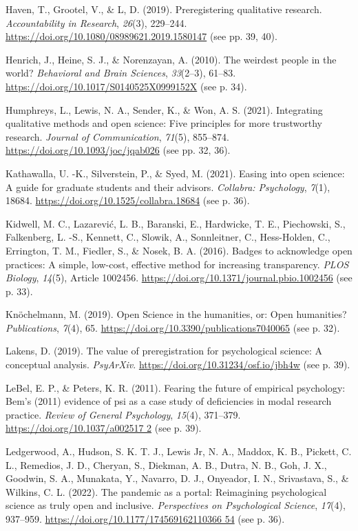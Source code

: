 \documentclass[authordate, empirical,issue]{jote-new-article}
\begin{document}
Haven, T., Grootel, V., \& L, D. (2019). Preregistering qualitative research. \emph{Accountability in Research}, \emph{26}(3), 229–244. \url{https://doi.org/10.1080/08989621.2019.1580147} (see pp. 39, 40).

Henrich, J., Heine, S. J., \& Norenzayan, A. (2010). The weirdest people in the world? \emph{Behavioral and Brain Sciences}, \emph{33}(2–3), 61–83. \url{https://doi.org/10.1017/S0140525X0999152X} (see p. 34).

Humphreys, L., Lewis, N. A., Sender, K., \& Won, A. S. (2021). Integrating qualitative methods and open science: Five principles for more trustworthy research. \emph{Journal of Communication}, \emph{71}(5), 855–874. \url{https://doi.org/10.1093/joc/jqab026} (see pp. 32, 36).

Kathawalla, U. -K., Silverstein, P., \& Syed, M. (2021). Easing into open science: A guide for graduate students and their advisors. \emph{Collabra: Psychology}, \emph{7}(1), 18684. \url{https://doi.org/10.1525/collabra.18684} (see p. 36).

Kidwell, M. C., Lazarević, L. B., Baranski, E., Hardwicke, T. E., Piechowski, S., Falkenberg, L. -S., Kennett, C., Slowik, A., Sonnleitner, C., Hess-Holden, C., Errington, T. M., Fiedler, S., \& Nosek, B. A. (2016). Badges to acknowledge open practices: A simple, low-cost, effective method for increasing transparency. \emph{PLOS Biology}, \emph{14}(5), Article 1002456. \url{https://doi.org/10.1371/journal.pbio.1002456} (see p. 33).

Knöchelmann, M. (2019). Open Science in the humanities, or: Open humanities? \emph{Publications}, \emph{7}(4), 65. \url{https://doi.org/10.3390/publications7040065} (see p. 32).

Lakens, D. (2019). The value of preregistration for psychological science: A conceptual analysis. \emph{PsyArXiv}. \url{https://doi.org/10.31234/osf.io/jbh4w} (see p. 39).

LeBel, E. P., \& Peters, K. R. (2011). Fearing the future of empirical psychology: Bem’s (2011) evidence of psi as a case study of deficiencies in modal research practice. \emph{Review of General Psychology}, \emph{15}(4), 371–379. \url{https://doi.org/10.1037/a002517
2} (see p. 39).

Ledgerwood, A., Hudson, S. K. T. J., Lewis Jr, N. A., Maddox, K. B., Pickett, C. L., Remedios, J. D., Cheryan, S., Diekman, A. B., Dutra, N. B., Goh, J. X., Goodwin, S. A., Munakata, Y., Navarro, D. J., Onyeador, I. N., Srivastava, S., \& Wilkins, C. L. (2022). The pandemic as a portal: Reimagining psychological science as truly open and inclusive. \emph{Perspectives on Psychological Science}, \emph{17}(4), 937–959. \url{https://doi.org/10.1177/174569162110366 54} (see p. 36).
\end{document}
